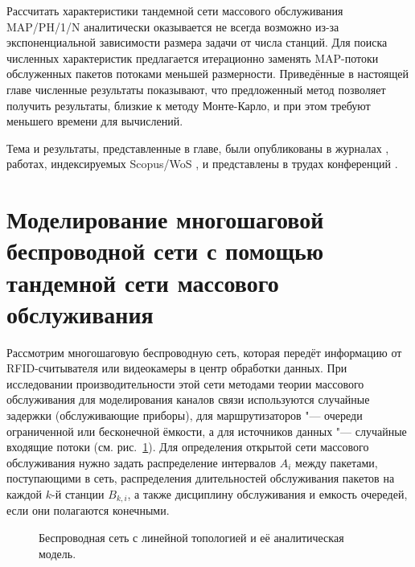Рассчитать характеристики тандемной сети массового обслуживания MAP/PH/1/N аналитически оказывается не всегда возможно из-за экспоненциальной зависимости размера задачи от числа станций. Для поиска численных характеристик предлагается итерационно заменять MAP-потоки обслуженных пакетов потоками меньшей размерности. Приведённые в настоящей главе численные результаты показывают, что предложенный метод позволяет получить результаты, близкие к методу Монте-Карло, и при этом требуют меньшего времени для вычислений.

Тема и результаты, представленные в главе, были опубликованы в журналах \cite{WINET_IJPAM2016, WINET_TCOMM2015, QS_JITCS2013, QS_JPU2013, QS_TCOMM2012}, работах, индексируемых Scopus/WoS \cite{QS_ICAAPSP2020, QS_ITMM2019, QS_ITMM2017, QS_AICT2017, QS_ITMM2016, QS_DCCN2016_CCIS}, и представлены в трудах конференций \cite{WINET_DCCN2018, QS_ITTMM2015, QS_DCCN2015}.






\section{Моделирование многошаговой беспроводной сети с помощью тандемной сети массового обслуживания}\label{sec:ch4_wireless_network_model}

Рассмотрим многошаговую беспроводную сеть, которая передёт информацию от RFID-считывателя или видеокамеры в центр обработки данных. При исследовании производительности этой сети методами теории массового обслуживания для моделирования каналов связи используются случайные задержки (обслуживающие приборы), для маршрутизаторов "--- очереди ограниченной или бесконечной ёмкости, а для источников данных "--- случайные входящие потоки (см. рис.~\ref{fig:ch4_network_model}). Для определения открытой сети массового обслуживания нужно задать распределение интервалов $A_i$ между пакетами, поступающими в сеть, распределения длительностей обслуживания пакетов на каждой $k$-й станции $B_{k,i}$, а также дисциплину обслуживания и емкость очередей, если они полагаются конечными.

\begin{figure}[h]
  \caption{Беспроводная сеть с линейной топологией и её аналитическая модель.}
  \label{fig:ch4_network_model}
\end{figure}

